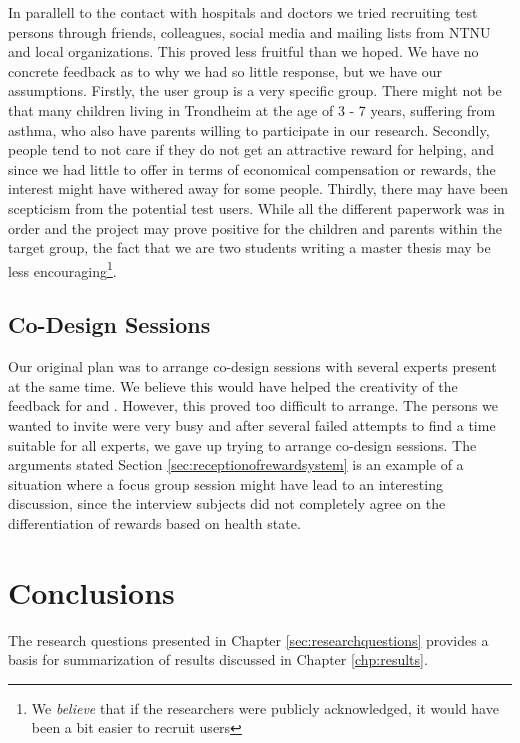 In parallell to the contact with hospitals and doctors we tried recruiting test persons through friends, colleagues, social media and mailing lists from NTNU and local organizations. This proved less fruitful than we hoped. We have no concrete feedback as to why we had so little response, but we have our assumptions. Firstly, the user group is a very specific group. There might not be that many children living in Trondheim at the age of 3 - 7 years, suffering from asthma, who also have parents willing to participate in our research. Secondly, people tend to not care if they do not get an attractive reward for helping, and since we had little to offer in terms of economical compensation or rewards, the interest might have withered away for some people. Thirdly, there may have been scepticism from the potential test users. While all the different paperwork was in order and the project may prove positive for the children and parents within the target group, the fact that we are two students writing a master thesis may be less encouraging\footnote{We \emph{believe} that if the researchers were publicly acknowledged, it would have been a bit easier to recruit users}.


\subsection{Co-Design Sessions}
\label{sec:codesignsessionsdifficulties}
Our original plan was to arrange co-design sessions with several experts present at the same time. We believe this would have helped the creativity of the feedback for \app{} and \ab{}. However, this proved too difficult to arrange. The persons we wanted to invite were very busy and after several failed attempts to find a time suitable for all experts, we gave up trying to arrange co-design sessions. The arguments stated Section \ref{sec:receptionofrewardsystem} is an example of a situation where a focus group session might have lead to an interesting discussion, since the interview subjects did not completely agree on the differentiation of rewards based on health state.

  
\section{Conclusions}
\label{conlusions}

The research questions presented in Chapter \ref{sec:researchquestions} provides a basis for summarization of results discussed in Chapter \ref{chp:results}. 

